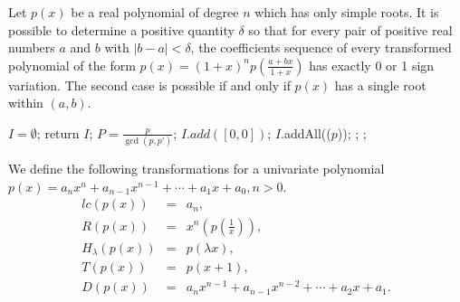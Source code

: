 


\begin{theorem}\label{thm:vin}
  Let $p(x)$ be a real polynomial of degree $n$ which has only simple roots. It is possible to determine a positive quantity $\delta$ so that for every pair of positive real numbers $a$ and $b$ with $|b-a| < \delta$, the coefficients sequence of every transformed polynomial of the form
  $  p(x) = (1+x)^{n}p(\frac{a+bx}{1+x}) $
		  has exactly 0 or 1 sign variation. The second case is possible if and only if $p(x)$ has a single root within $(a,b)$.
\end{theorem}

\begin{algorithm}
\caption{\algm \label{alg:main}}
\DontPrintSemicolon
{}
$I=\emptyset$; \;
  {return $I$;}
$P=\frac{p}{\gcd(p,p')}$; 
 { $I.add([0,0])$; 
}
$I$.addAll(\algcf($p$)); \;
 
;\;
; 
\end{algorithm}


\begin{definition}  We define the following transformations for a univariate polynomial $p(x)=a_nx^n+a_{n-1}x^{n-1}+\cdots+a_1x+a_0,n>0$.
  \begin{eqnarray*}
  lc(p(x))&=&a_n,\\
  R(p(x))&=&x^n(p(\frac{1}{x})),\\
  H_\lambda(p(x))&=&p(\lambda x),\\
  T(p(x))&=&p(x+1), \\
  D(p(x))&=&a_nx^{n-1}+a_{n-1}x^{n-2}+\cdots+a_2x+a_1.
  \end{eqnarray*}
\end{definition}

